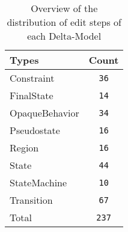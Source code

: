 \begin{table} 
 \center 
 \small 
\begin{tabular}{|l|c|}
\hline
Types & Count\\ 
  \hline 
Constraint & \texttt{36}\\ 
  \hline 
FinalState & \texttt{14}\\ 
  \hline 
OpaqueBehavior & \texttt{34}\\ 
  \hline 
Pseudostate & \texttt{16}\\ 
  \hline 
Region & \texttt{16}\\ 
  \hline 
State & \texttt{44}\\ 
  \hline 
StateMachine & \texttt{10}\\ 
  \hline 
Transition & \texttt{67}\\ 
  \hline 
Total & \texttt{237}\\ 
  \hline 
\end{tabular}
\caption[Overview: Delta-Models]{Overview of the distribution of edit steps of each Delta-Model}
\end{table}

